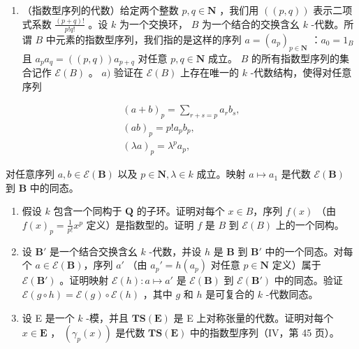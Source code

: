\BourbakiExerciseGroup

\begin{enumerate}
\def\labelenumi{\arabic{enumi})}
\tightlist
\item
  （指数型序列的代数）给定两个整数 \(p, q \in \mathbf{N}\) ，我们用 \(((p, q))\) 表示二项式系数 \(\frac{(p + q)!}{p!q!}\) 。设 \(k\) 为一个交换环， \(B\) 为一个结合的交换含幺 \(k\) -代数。所谓 \(B\) 中元素的指数型序列，我们指的是这样的序列 \(a = (a_p)_{p \in \mathbf{N}}\) ：\(a_0 = 1_B\) 且 \(a_p a_q = ((p, q)) a_{p + q}\) 对任意 \(p, q \in \mathbf{N}\) 成立。 \(B\) 的所有指数型序列的集合记作 \(\mathcal{E}(B)\) 。 \(a)\) 验证在 \(\mathcal{E}(B)\) 上存在唯一的 \(k\) -代数结构，使得对任意序列
\end{enumerate}

\[
\begin{array}{c} (a + b) _ {p} = \sum_ {r + s = p} a _ {r} b _ {s}, \\ (a b) _ {p} = p! a _ {p} b _ {p}, \\ (\lambda a) _ {p} = \lambda^ {p} a _ {p}, \end{array}
\]

对任意序列 \(a, b \in \mathcal{E}(\mathbf{B})\) 以及 \(p \in \mathbf{N}, \lambda \in k\) 成立。映射 \(a \mapsto a_1\) 是代数 \(\mathcal{E}(\mathbf{B})\) 到 \(\mathbf{B}\) 中的同态。

\begin{enumerate}
\def\labelenumi{\alph{enumi})}
\setcounter{enumi}{1}
\item
  假设 \(k\) 包含一个同构于 \(\mathbf{Q}\) 的子环。证明对每个 \(x \in B\)，序列 \(f(x)\) （由 \(f(x)_p = \frac{1}{p!} x^p\) 定义）是指数型的。证明 \(f\) 是 \(B\) 到 \(\mathcal{E}(B)\) 上的一个同构。
\item
  设 \(\mathbf{B}'\) 是一个结合交换含幺 \(k\) -代数，并设 \(h\) 是 \(\mathbf{B}\) 到 \(\mathbf{B}'\) 中的一个同态。对每个 \(a \in \mathcal{E}(\mathbf{B})\)，序列 \(a'\) （由 \(a_p' = h(a_p)\) 对任意 \(p \in \mathbf{N}\) 定义）属于 \(\mathcal{E}(\mathbf{B}')\) 。证明映射 \(\mathcal{E}(h): a \mapsto a'\) 是 \(\mathcal{E}(\mathbf{B})\) 到 \(\mathcal{E}(\mathbf{B}')\) 中的同态。验证 \(\mathcal{E}(g \circ h) = \mathcal{E}(g) \circ \mathcal{E}(h)\) ，其中 \(g\) 和 \(h\) 是可复合的 \(k\) -代数同态。
\item
  设 E 是一个 \(k\) -模，并且 \(\mathbf{TS}(\mathbf{E})\) 是 E 上对称张量的代数。证明对每个 \(x \in \mathbf{E}\) ， \((\gamma_p(x))\) 是代数 \(\mathbf{TS}(\mathbf{E})\) 中的指数型序列（IV，第 45 页）。
\end{enumerate}

